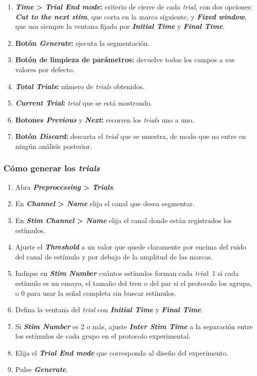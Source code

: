 \documentclass[11pt,a4paper]{article}
\begin{document}
\begin{enumerate}[label=(\arabic*)]
        \item \textbf{\textit{Time} > \textit{Trial End mode}:} criterio de cierre de cada \textit{trial}, con dos opciones: \textbf{\textit{Cut to the next stim}}, que corta en la marca siguiente, y \textbf{\textit{Fixed window}}, que usa siempre la ventana fijada por \textbf{\textit{Initial Time}} y \textbf{\textit{Final Time}}.
        \item \textbf{Bot\'on \textit{Generate}:} ejecuta la segmentaci\'on.
        \item \textbf{Bot\'on de limpieza de par\'ametros:} devuelve todos los campos a sus valores por defecto.
        \item \textbf{\textit{Total Trials}:} n\'umero de \textit{trials} obtenidos.
        \item \textbf{\textit{Current Trial}:} \textit{trial} que se est\'a mostrando.
        \item \textbf{Botones \textit{Previous}} y \textbf{\textit{Next}:} recorren los \textit{trials} uno a uno.
        \item \textbf{Bot\'on \textit{Discard}:} descarta el \textit{trial} que se muestra, de modo que no entre en ning\'un an\'alisis posterior.
    \end{enumerate}

    \subsubsection*{C\'omo generar los \textit{trials}}
    \begin{enumerate}
        \item Abra \textbf{\textit{Preprocessing} > \textit{Trials}}.
        \item En \textbf{\textit{Channel} > \textit{Name}} elija el canal que desea segmentar.
        \item En \textbf{\textit{Stim Channel} > \textit{Name}} elija el canal donde est\'an registrados los est\'imulos.
        \item Ajuste el \textbf{\textit{Threshold}} a un valor que quede claramente por encima del ruido del canal de est\'imulo y por debajo de la amplitud de las marcas.
        \item Indique en \textbf{\textit{Stim Number}} cu\'antos est\'imulos forman cada \textit{trial}: 1 si cada est\'imulo es un ensayo, el tama\~no del tren o del par si el protocolo los agrupa, o 0 para usar la se\~nal completa sin buscar est\'imulos.
        \item Defina la ventana del \textit{trial} con \textbf{\textit{Initial Time}} y \textbf{\textit{Final Time}}.
        \item Si \textbf{\textit{Stim Number}} es 2 o m\'as, ajuste \textbf{\textit{Inter Stim Time}} a la separaci\'on entre los est\'imulos de cada grupo en el protocolo experimental.
        \item Elija el \textbf{\textit{Trial End mode}} que corresponda al dise\~no del experimento.
        \item Pulse \textbf{\textit{Generate}}.
    \end{enumerate}
\end{document}
